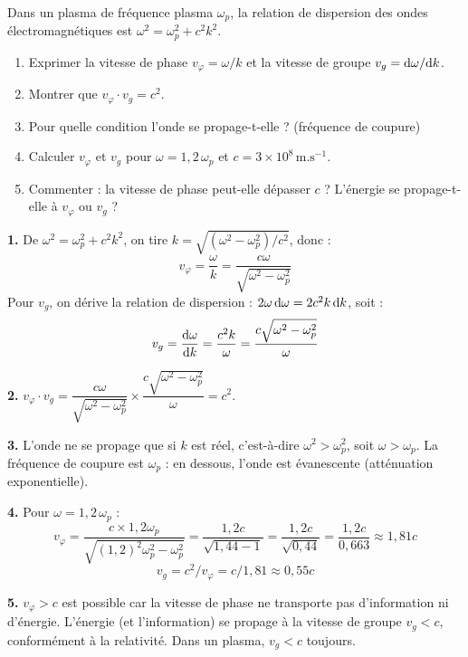 \documentclass[12pt,a4paper]{article}
\begin{document}
\begin{boiteexercice}
Dans un plasma de fréquence plasma $\omega_p$, la relation de dispersion des ondes électromagnétiques est $\omega^2 = \omega_p^2 + c^2k^2$.
\begin{enumerate}
  \item Exprimer la vitesse de phase $v_\varphi = \omega/k$ et la vitesse de groupe $v_g = \mathrm{d}\omega/\mathrm{d} k$.
  \item Montrer que $v_\varphi\cdot v_g = c^2$.
  \item Pour quelle condition l'onde se propage-t-elle ? (fréquence de coupure)
  \item Calculer $v_\varphi$ et $v_g$ pour $\omega = 1{,}2\,\omega_p$ et $c = 3\times10^8\,\text{m.s}^{-1}$.
  \item Commenter : la vitesse de phase peut-elle dépasser $c$ ? L'énergie se propage-t-elle à $v_\varphi$ ou $v_g$ ?
\end{enumerate}
\end{boiteexercice}

\newpage
\begin{boitecorrige}
\textbf{1.} De $\omega^2 = \omega_p^2 + c^2k^2$, on tire $k = \sqrt{(\omega^2-\omega_p^2)/c^2}$, donc :
\[
v_\varphi = \frac{\omega}{k} = \frac{c\omega}{\sqrt{\omega^2-\omega_p^2}}
\]
Pour $v_g$, on dérive la relation de dispersion : $2\omega\,\mathrm{d}\omega = 2c^2k\,\mathrm{d} k$, soit :
\[
v_g = \frac{\mathrm{d}\omega}{\mathrm{d} k} = \frac{c^2k}{\omega} = \frac{c\sqrt{\omega^2-\omega_p^2}}{\omega}
\]

\textbf{2.} $v_\varphi\cdot v_g = \dfrac{c\omega}{\sqrt{\omega^2-\omega_p^2}}\times\dfrac{c\sqrt{\omega^2-\omega_p^2}}{\omega} = c^2$.

\textbf{3.} L'onde ne se propage que si $k$ est réel, c'est-à-dire $\omega^2 > \omega_p^2$, soit $\omega > \omega_p$. La fréquence de coupure est $\omega_p$ : en dessous, l'onde est évanescente (atténuation exponentielle).

\textbf{4.} Pour $\omega = 1{,}2\,\omega_p$ :
\[
v_\varphi = \frac{c\times1{,}2\omega_p}{\sqrt{(1{,}2)^2\omega_p^2-\omega_p^2}} = \frac{1{,}2c}{\sqrt{1{,}44-1}} = \frac{1{,}2c}{\sqrt{0{,}44}} = \frac{1{,}2c}{0{,}663} \approx 1{,}81c
\]
\[
v_g = c^2/v_\varphi = c/1{,}81 \approx 0{,}55c
\]

\textbf{5.} $v_\varphi > c$ est possible car la vitesse de phase ne transporte pas d'information ni d'énergie. L'énergie (et l'information) se propage à la vitesse de groupe $v_g < c$, conformément à la relativité. Dans un plasma, $v_g < c$ toujours.
\end{boitecorrige}
\end{document}
